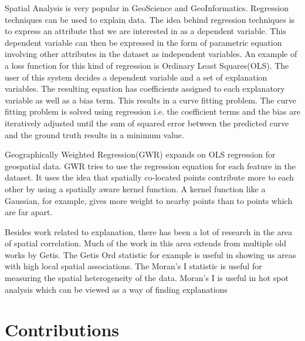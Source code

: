 Spatial Analysis is very popular in GeoScience and GeoInformatics. Regression techniques can be used to explain data\citep{dunn1986applied,cleveland1988locally}. The idea behind regression techniques is to express an attribute that we are interested in as a dependent variable. This dependent variable can then be expressed in the form of parametric equation involving other attributes in the dataset as independent variables. An example of a loss function for this kind of regression is Ordinary Least Squares(OLS)\citep{dismuke2006ordinary}. The user of this system decides a dependent variable and a set of explanation variables. The resulting equation has coefficients assigned to each explanatory variable as well as a bias term. This results in a curve fitting problem. The curve fitting problem is solved using regression i.e. the coefficient terms and the bias are iteratively adjusted until the sum of squared error between the predicted curve and the ground truth results in a minimum value.

Geographically Weighted Regression(GWR) expands on OLS regression for geospatial data\citep{brunsdon1998geographically,charlton2009geographically}. GWR tries to use the regression equation for each feature in the dataset. It uses the idea that spatially co-located points contribute more to each other by using a spatially aware kernel function. A kernel function like a Gaussian, for example, gives more weight to nearby points than to points which are far apart.

Besides work related to explanation, there has been a lot of research in the area of spatial correlation. Much of the work in this area extends from multiple old works by Getis\citep{getis1991spatial,ord1995local,getis1996local,getis2002comparative,getis2007reflections}. The Getis Ord statistic \citep{ord1995local} for example is useful in showing us areas with high local spatial associations. The Moran's I statistic is useful for measuring the spatial heterogeneity of the data\citep{assuncao1999new,zhang2008use}. Moran's I is useful in hot spot analysis which can be viewed as a way of finding explanations

\section{Contributions}


